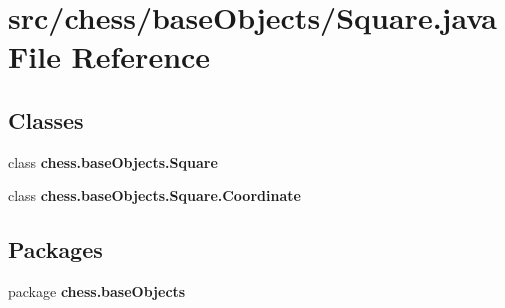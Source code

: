 \section{src/chess/base\+Objects/\+Square.java File Reference}
\label{_square_8java}
\subsection*{Classes}
\begin{DoxyCompactItemize}
\item 
class {\bf chess.\+base\+Objects.\+Square}
\item 
class {\bfseries chess.\+base\+Objects.\+Square.\+Coordinate}
\end{DoxyCompactItemize}
\subsection*{Packages}
\begin{DoxyCompactItemize}
\item 
package {\bf chess.\+base\+Objects}
\end{DoxyCompactItemize}
